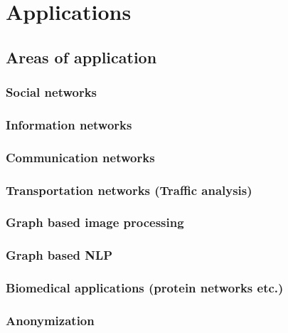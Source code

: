 \chapter{Applications}
\label{ch:applications}


\section{Areas of application}
\label{sect:app_areas}

	\subsection{Social networks}
	\label{ssect:social_networks}
	
	\subsection{Information networks}
	\label{ssect:app_information_networks}
	
	\subsection{Communication networks}
	\label{ssect:app_communication_networks}
	
	\subsection{Transportation networks (Traffic analysis)}
	\label{ssect:app_transportation_networks}
	
	\subsection{Graph based image processing}
	\label{ssect:app_graph_img_proc}
	
	\subsection{Graph based NLP}
	\label{ssect:app_graph_nlp}
	
	\subsection{Biomedical applications (protein networks etc.)}
	\label{ssect:app_biomed}
	
	\subsection{Anonymization}
	\label{ssect:app_snonymization}
	
